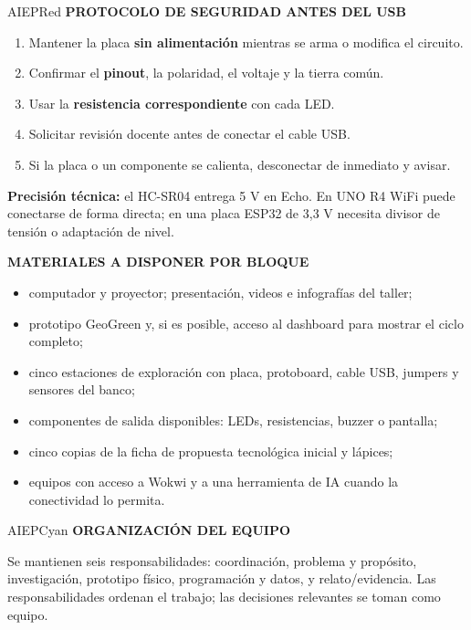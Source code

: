 \documentclass[10pt,a4paper]{article}
\newcommand{\labeltext}[1]{%
  {\scriptsize\bfseries\color{AIEPSlate}\MakeUppercase{#1}}\par\vspace{1.2mm}
}
\begin{document}
\begin{softcard}{AIEPRed}
\labeltext{Protocolo de seguridad antes del USB}
\begin{enumerate}
  \item Mantener la placa \textbf{sin alimentación} mientras se arma o modifica el circuito.
  \item Confirmar el \textbf{pinout}, la polaridad, el voltaje y la tierra común.
  \item Usar la \textbf{resistencia correspondiente} con cada LED.
  \item Solicitar revisión docente antes de conectar el cable USB.
  \item Si la placa o un componente se calienta, desconectar de inmediato y avisar.
\end{enumerate}
\textbf{Precisión técnica:} el HC-SR04 entrega 5 V en Echo. En UNO R4 WiFi puede conectarse de forma
directa; en una placa ESP32 de 3,3 V necesita divisor de tensión o adaptación de nivel.
\end{softcard}

\begin{card}
\labeltext{Materiales a disponer por bloque}
\begin{itemize}
  \item computador y proyector; presentación, videos e infografías del taller;
  \item prototipo GeoGreen y, si es posible, acceso al dashboard para mostrar el ciclo completo;
  \item cinco estaciones de exploración con placa, protoboard, cable USB, jumpers y sensores del banco;
  \item componentes de salida disponibles: LEDs, resistencias, buzzer o pantalla;
  \item cinco copias de la ficha de propuesta tecnológica inicial y lápices;
  \item equipos con acceso a Wokwi y a una herramienta de IA cuando la conectividad lo permita.
\end{itemize}
\end{card}

\begin{softcard}{AIEPCyan}
\labeltext{Organización del equipo}
Se mantienen seis responsabilidades: coordinación, problema y propósito, investigación, prototipo
físico, programación y datos, y relato/evidencia. Las responsabilidades ordenan el trabajo; las
decisiones relevantes se toman como equipo.
\end{softcard}
\end{document}
